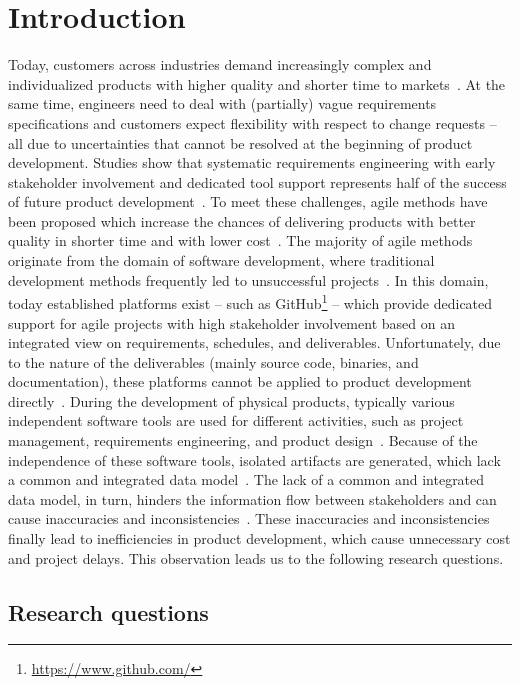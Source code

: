\section{Introduction}
\label{sec:introduction}

Today, customers across industries demand increasingly complex and individualized products with higher quality and shorter time to markets~\cite{Ahti2005}.
At the same time, engineers need to deal with (partially) vague requirements specifications and customers expect flexibility with respect to change requests -- all due to uncertainties that cannot be resolved at the beginning of product development.
Studies show that systematic requirements engineering with early stakeholder involvement and dedicated tool support represents half of the success of future product development~\cite{6226784}.
To meet these challenges, agile methods have been proposed which increase the chances of delivering products with better quality in shorter time and with lower cost~\cite{ozkan2019agile}. 
The majority of agile methods originate from the domain of software development, where traditional development methods frequently led to unsuccessful projects~\cite{HEIMICKE2021786}.
In this domain, today established platforms exist -- such as GitHub\footnote{\url{https://www.github.com/}} -- which provide dedicated support for agile projects with high stakeholder involvement based on an integrated view on requirements, schedules, and deliverables.
Unfortunately, due to the nature of the deliverables (mainly source code, binaries, and documentation), these platforms cannot be applied to product development directly~\cite{HEIMICKE2021786}. 
During the development of physical products, typically various independent software tools are used for different activities, such as project management, requirements engineering, and product design~\cite{MarionTucker}.
Because of the independence of these software tools, isolated artifacts are generated, which lack a common and integrated data model~\cite{houshmand2010collaborative}.
The lack of a common and integrated data model, in turn, hinders the information flow between stakeholders and can cause inaccuracies and inconsistencies~\cite{Jorma2014}.
These inaccuracies and inconsistencies finally lead to inefficiencies in product development, which cause unnecessary cost and project delays.
This observation leads us to the following research questions.

\subsection{Research questions}

